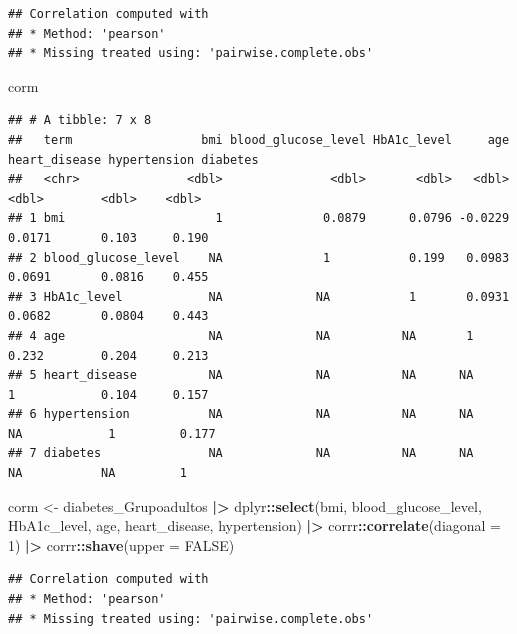 \documentclass[
]{article}
\newenvironment{Shaded}{\begin{snugshade}}{\end{snugshade}}
\newcommand{\AttributeTok}[1]{\textcolor[rgb]{0.13,0.29,0.53}{#1}}
\newcommand{\ConstantTok}[1]{\textcolor[rgb]{0.56,0.35,0.01}{#1}}
\newcommand{\DecValTok}[1]{\textcolor[rgb]{0.00,0.00,0.81}{#1}}
\newcommand{\FunctionTok}[1]{\textcolor[rgb]{0.13,0.29,0.53}{\textbf{#1}}}
\newcommand{\NormalTok}[1]{#1}
\newcommand{\OtherTok}[1]{\textcolor[rgb]{0.56,0.35,0.01}{#1}}
\newcommand{\SpecialCharTok}[1]{\textcolor[rgb]{0.81,0.36,0.00}{\textbf{#1}}}
\begin{document}
\begin{verbatim}
## Correlation computed with
## * Method: 'pearson'
## * Missing treated using: 'pairwise.complete.obs'
\end{verbatim}

\begin{Shaded}
\begin{Highlighting}[]
\NormalTok{corm}
\end{Highlighting}
\end{Shaded}

\begin{verbatim}
## # A tibble: 7 x 8
##   term                  bmi blood_glucose_level HbA1c_level     age heart_disease hypertension diabetes
##   <chr>               <dbl>               <dbl>       <dbl>   <dbl>         <dbl>        <dbl>    <dbl>
## 1 bmi                     1              0.0879      0.0796 -0.0229        0.0171       0.103     0.190
## 2 blood_glucose_level    NA              1           0.199   0.0983        0.0691       0.0816    0.455
## 3 HbA1c_level            NA             NA           1       0.0931        0.0682       0.0804    0.443
## 4 age                    NA             NA          NA       1             0.232        0.204     0.213
## 5 heart_disease          NA             NA          NA      NA             1            0.104     0.157
## 6 hypertension           NA             NA          NA      NA            NA            1         0.177
## 7 diabetes               NA             NA          NA      NA            NA           NA         1
\end{verbatim}

\begin{Shaded}
\begin{Highlighting}[]
\NormalTok{corm }\OtherTok{\textless{}{-}}
\NormalTok{  diabetes\_Grupoadultos }\SpecialCharTok{|\textgreater{}}
\NormalTok{  dplyr}\SpecialCharTok{::}\FunctionTok{select}\NormalTok{(bmi, blood\_glucose\_level, HbA1c\_level, age, heart\_disease, hypertension) }\SpecialCharTok{|\textgreater{}}
\NormalTok{  corrr}\SpecialCharTok{::}\FunctionTok{correlate}\NormalTok{(}\AttributeTok{diagonal =} \DecValTok{1}\NormalTok{) }\SpecialCharTok{|\textgreater{}}
\NormalTok{  corrr}\SpecialCharTok{::}\FunctionTok{shave}\NormalTok{(}\AttributeTok{upper =} \ConstantTok{FALSE}\NormalTok{)}
\end{Highlighting}
\end{Shaded}

\begin{verbatim}
## Correlation computed with
## * Method: 'pearson'
## * Missing treated using: 'pairwise.complete.obs'
\end{verbatim}
\end{document}
